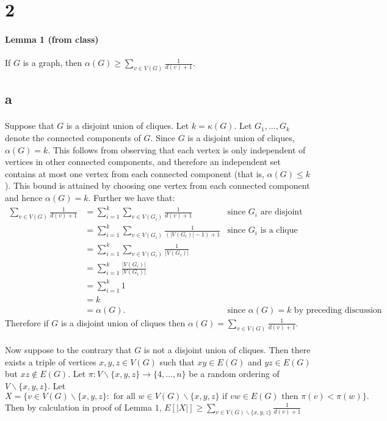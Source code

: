\documentclass[letterpaper,12pt,oneside,onecolumn]{article}
\begin{document}
\section*{2}
\paragraph{Lemma 1 (from class)}
If $G$ is a graph, then $\alpha(G) \geq \sum_{v\in V(G)} \frac{1}{d(v) +1}$.
\subsection*{a}
\paragraph{}
Suppose that $G$ is a disjoint union of cliques. Let $k = \kappa(G)$. Let $G_1,\dots, G_k$ denote the connected components of $G$. Since $G$ is a disjoint union of cliques, $\alpha(G) = k$. This follows from observing that each vertex is only independent of vertices in other connected components, and therefore an independent set contains at most one vertex from each connected component (that is, $\alpha(G) \leq k$). This bound is attained by choosing one vertex from each connected component and hence $\alpha(G) = k$. Further we have that:
\begin{align*}
\sum_{v \in V(G)} \frac{1}{d(v) +1} &= \sum_{i=1}^k \sum_{v \in V(G_i)} \frac{1}{d(v) + 1} &\text{since $G_i$ are disjoint}\\
&= \sum_{i=1}^k \sum_{v \in V(G_i)} \frac{1}{(|V(G_i)| -1) + 1} &\text{since $G_i$ is a clique} \\
&= \sum_{i=1}^k \sum_{v \in V(G_i)} \frac{1}{|V(G_i)|} \\
&= \sum_{i=1}^k \frac{|V(G_i)|}{|V(G_i)|} \\
&= \sum_{i=1}^k 1 \\
&= k \\
&=\alpha(G). &\text{since $\alpha(G) = k$ by preceding discussion}
\end{align*}
Therefore if $G$ is a disjoint union of cliques then $\alpha(G) = \sum_{v \in V(G)} \frac{1}{d(v) +1}$.
\paragraph{}
Now suppose to the contrary that $G$ is not a disjoint union of cliques. Then there exists a triple of vertices $x, y, z \in V(G)$ such that $xy \in E(G)$ and $yz \in E(G)$ but $xz \not\in E(G)$. Let $\pi: V \backslash \{x,y,z\} \rightarrow \{4, \dots, n\}$ be a random ordering of $V\backslash \{x,y,z\}$.  Let $$X = \{v \in V(G)\backslash \{x,y,z\}:\text{ for all }w\in V(G)\backslash \{x,y,z\}\text{ if }vw \in E(G)\text{ then }\pi(v) < \pi(w)\}.$$ Then by calculation in proof of Lemma $1$, $E[|X|] \geq \sum_{v\in V(G)\backslash \{x,y,z\}}\frac{1}{d(v)+1}$
\end{document}
